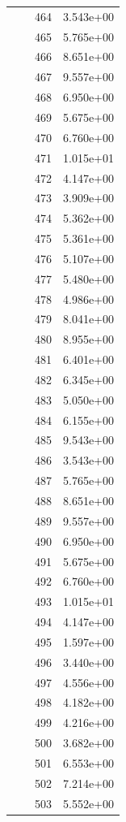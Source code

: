 \documentclass[12pt]{article}
\begin{document}
\begin{longtable}{@{}cccc@{}}
 &  & 464 & 3.543e+00 \\
 &  & 465 & 5.765e+00 \\
 &  & 466 & 8.651e+00 \\
 &  & 467 & 9.557e+00 \\
 &  & 468 & 6.950e+00 \\
 &  & 469 & 5.675e+00 \\
 &  & 470 & 6.760e+00 \\
 &  & 471 & 1.015e+01 \\
 &  & 472 & 4.147e+00 \\
 &  & 473 & 3.909e+00 \\
 &  & 474 & 5.362e+00 \\
 &  & 475 & 5.361e+00 \\
 &  & 476 & 5.107e+00 \\
 &  & 477 & 5.480e+00 \\
 &  & 478 & 4.986e+00 \\
 &  & 479 & 8.041e+00 \\
 &  & 480 & 8.955e+00 \\
 &  & 481 & 6.401e+00 \\
 &  & 482 & 6.345e+00 \\
 &  & 483 & 5.050e+00 \\
 &  & 484 & 6.155e+00 \\
 &  & 485 & 9.543e+00 \\
 &  & 486 & 3.543e+00 \\
 &  & 487 & 5.765e+00 \\
 &  & 488 & 8.651e+00 \\
 &  & 489 & 9.557e+00 \\
 &  & 490 & 6.950e+00 \\
 &  & 491 & 5.675e+00 \\
 &  & 492 & 6.760e+00 \\
 &  & 493 & 1.015e+01 \\
 &  & 494 & 4.147e+00 \\
 &  & 495 & 1.597e+00 \\
 &  & 496 & 3.440e+00 \\
 &  & 497 & 4.556e+00 \\
 &  & 498 & 4.182e+00 \\
 &  & 499 & 4.216e+00 \\
 &  & 500 & 3.682e+00 \\
 &  & 501 & 6.553e+00 \\
 &  & 502 & 7.214e+00 \\
 &  & 503 & 5.552e+00 \\

\end{longtable}
\end{document}
